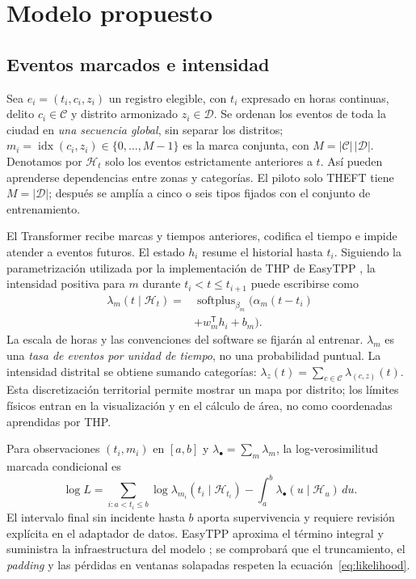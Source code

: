 \documentclass[10pt,a4paper,twocolumn]{article}
\begin{document}
\section{Modelo propuesto}
\subsection{Eventos marcados e intensidad}
Sea $e_i=(t_i,c_i,z_i)$ un registro elegible, con $t_i$ expresado en horas continuas, delito $c_i\in\mathcal C$ y distrito armonizado $z_i\in\mathcal D$. Se ordenan los eventos de toda la ciudad en \emph{una secuencia global}, sin separar los distritos; $m_i=\operatorname{idx}(c_i,z_i)\in\{0,\ldots,M-1\}$ es la marca conjunta, con $M=|\mathcal C|\,|\mathcal D|$. Denotamos por $\mathcal H_t$ solo los eventos estrictamente anteriores a $t$. Así pueden aprenderse dependencias entre zonas y categorías. El piloto solo THEFT tiene $M=|\mathcal D|$; después se amplía a cinco o seis tipos fijados con el conjunto de entrenamiento.

El Transformer recibe marcas y tiempos anteriores, codifica el tiempo e impide atender a eventos futuros. El estado $h_i$ resume el historial hasta $t_i$. Siguiendo la parametrización utilizada por la implementación de THP de EasyTPP \cite{easytppRepo}, la intensidad positiva para $m$ durante $t_i<t\leq t_{i+1}$ puede escribirse como
\begin{equation}
\begin{split}
\lambda_m(t\mid\mathcal H_t)={}&\operatorname{softplus}_{\beta_m}\bigl(
\alpha_m(t-t_i)\\
&+w_m^{\mathsf T}h_i+b_m\bigr).
\end{split}
\label{eq:intensidad}
\end{equation}
La escala de horas y las convenciones del software se fijarán al entrenar. $\lambda_m$ es una \emph{tasa de eventos por unidad de tiempo}, no una probabilidad puntual. La intensidad distrital se obtiene sumando categorías: $\lambda_z(t)=\sum_{c\in\mathcal C}\lambda_{(c,z)}(t)$. Esta discretización territorial permite mostrar un mapa por distrito; los límites físicos entran en la visualización y en el cálculo de área, no como coordenadas aprendidas por THP.

Para observaciones $(t_i,m_i)$ en $[a,b]$ y $\lambda_{\bullet}=\sum_m\lambda_m$, la log-verosimilitud marcada condicional es \cite{rasmussen2018notes}
\begin{equation}
\log L=\sum_{i:a<t_i\leq b}\log\lambda_{m_i}(t_i\mid\mathcal H_{t_i})-\int_a^b\lambda_{\bullet}(u\mid\mathcal H_u)\,du.
\label{eq:likelihood}
\end{equation}
El intervalo final sin incidente hasta $b$ aporta supervivencia y requiere revisión explícita en el adaptador de datos. EasyTPP aproxima el término integral y suministra la infraestructura del modelo \cite{xue2024easytpp}; se comprobará que el truncamiento, el \emph{padding} y las pérdidas en ventanas solapadas respeten la ecuación~\ref{eq:likelihood}.
\end{document}
